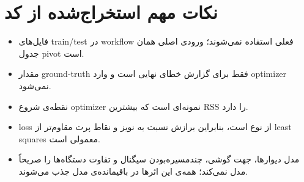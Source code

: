 \documentclass[12pt,a4paper]{article}
\begin{document}
\section{نکات مهم استخراج‌شده از کد}
\begin{itemize}
  \item فایل‌های train/test در workflow فعلی استفاده نمی‌شوند؛ ورودی اصلی همان جدول pivot است.
  \item مقدار ground-truth فقط برای گزارش خطای نهایی است و وارد optimizer نمی‌شود.
  \item نقطه‌ی شروع optimizer نمونه‌ای است که بیشترین RSS را دارد.
  \item loss از نوع  است، بنابراین برازش نسبت به نویز و نقاط پرت مقاوم‌تر از least squares معمولی است.
  \item مدل دیوارها، جهت گوشی، چندمسیره‌بودن سیگنال و تفاوت دستگاه‌ها را صریحاً مدل نمی‌کند؛ همه‌ی این اثرها در باقیمانده‌ی مدل جذب می‌شوند.
\end{itemize}
\end{document}
